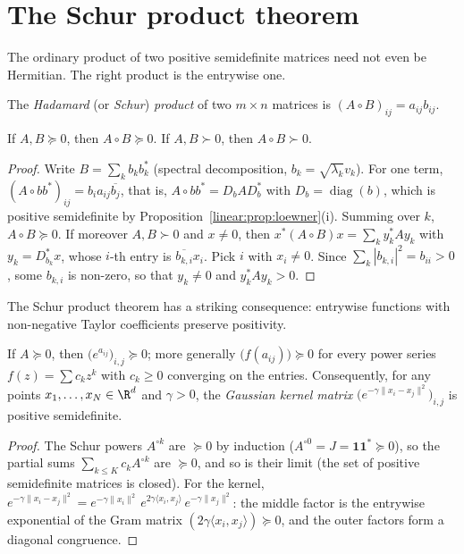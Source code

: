 \section{The Schur product theorem}

The ordinary product of two positive semidefinite matrices need not even be Hermitian. The right product is the entrywise one.

\begin{definition}\label{linear:def:hadamardproduct}
The \emph{Hadamard} (or \emph{Schur}) \emph{product} of two $m\times n$ matrices is $(A\circ B)_{ij}=a_{ij}b_{ij}$.
\end{definition}

\begin{theorem}[Schur, 1911]\label{linear:thm:schurproduct}
If $A,B\succeq0$, then $A\circ B\succeq0$. If $A,B\succ0$, then $A\circ B\succ0$.
\end{theorem}
\begin{proof}
Write $B=\sum_kb_kb_k^*$ (spectral decomposition, $b_k=\sqrt{\lambda_k}v_k$). For one term, $(A\circ b b^*)_{ij}=b_ia_{ij}\overline{b_j}$, that
is, $A\circ bb^*=D_bAD_b^*$ with $D_b=\operatorname{diag}(b)$, which is positive semidefinite by Proposition~\ref{linear:prop:loewner}(i).
Summing over $k$, $A\circ B\succeq0$. If moreover $A,B\succ0$ and $x\ne0$, then $x^*(A\circ B)x=\sum_ky_k^*Ay_k$ with $y_k=D_{b_k}^*x$, whose
$i$-th entry is $\overline{b_{k,i}}x_i$. Pick $i$ with $x_i\ne0$. Since $\sum_k|b_{k,i}|^2=b_{ii}>0$, some $b_{k,i}$ is non-zero, so that
$y_k\ne0$ and $y_k^*Ay_k>0$.
\end{proof}

The Schur product theorem has a striking consequence: entrywise functions with non-negative Taylor coefficients preserve positivity.

\begin{corollary}\label{linear:cor:entrywiseexp}
If $A\succeq0$, then $\bigl(e^{a_{ij}}\bigr)_{i,j}\succeq0$; more generally $\bigl(f(a_{ij})\bigr)\succeq0$ for every power series $f(z)=\sum c_kz^k$
with $c_k\ge0$ converging on the entries. Consequently, for any points $x_1,\dots,x_N\in\R^d$ and $\gamma>0$, the \emph{Gaussian kernel
matrix} $\bigl(e^{-\gamma\|x_i-x_j\|^2}\bigr)_{i,j}$ is positive semidefinite.
\end{corollary}
\begin{proof}
The Schur powers $A^{\circ k}$ are $\succeq0$ by induction ($A^{\circ0}=J=\mathbf 1\mathbf 1^*\succeq0$), so the partial sums
$\sum_{k\le K}c_kA^{\circ k}$ are $\succeq0$, and so is their limit (the set of positive semidefinite matrices is closed). For the kernel,
$e^{-\gamma\|x_i-x_j\|^2}=e^{-\gamma\|x_i\|^2}\,e^{2\gamma\langle x_i,x_j\rangle}\,e^{-\gamma\|x_j\|^2}$: the middle factor is the entrywise
exponential of the Gram matrix $(2\gamma\langle x_i,x_j\rangle)\succeq0$, and the outer factors form a diagonal congruence.
\end{proof}

